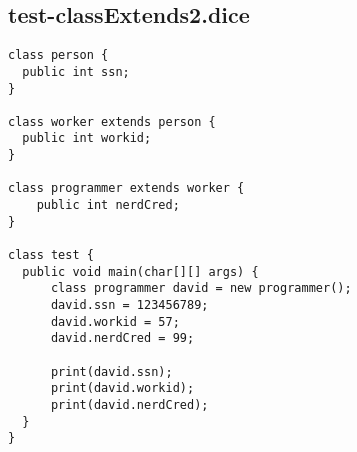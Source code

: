 \subsection{test-classExtends2.dice}
\begin{verbatim}
class person {
  public int ssn;
}

class worker extends person {
  public int workid;
}

class programmer extends worker {
	public int nerdCred;
}

class test {
  public void main(char[][] args) {
      class programmer david = new programmer();
      david.ssn = 123456789;
      david.workid = 57;
      david.nerdCred = 99;

      print(david.ssn);
      print(david.workid);
      print(david.nerdCred);
  }
}
\end{verbatim}